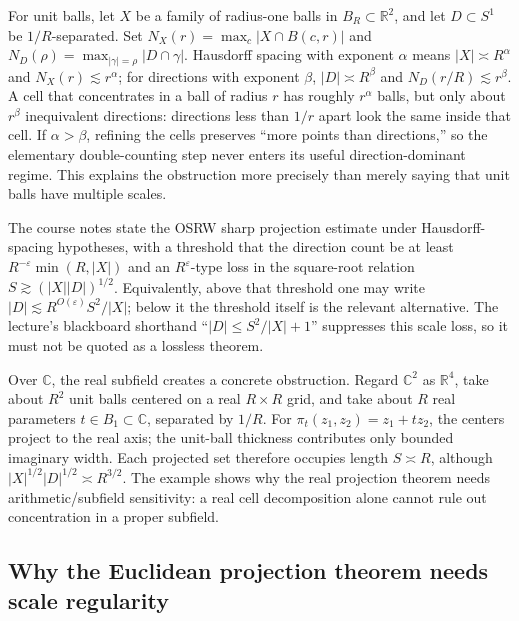 For unit balls, let \(X\) be a family of radius-one balls in \(B_R\subset\mathbb R^2\), and let \(D\subset S^1\) be \(1/R\)-separated. Set \(N_X(r)=\max_c|X\cap B(c,r)|\) and \(N_D(\rho)=\max_{|\gamma|=\rho}|D\cap\gamma|\). Hausdorff spacing with exponent \(\alpha\) means \(|X|\asymp R^\alpha\) and \(N_X(r)\lesssim r^\alpha\); for directions with exponent \(\beta\), \(|D|\asymp R^\beta\) and \(N_D(r/R)\lesssim r^\beta\). A cell that concentrates in a ball of radius \(r\) has roughly \(r^\alpha\) balls, but only about \(r^\beta\) inequivalent directions: directions less than \(1/r\) apart look the same inside that cell. If \(\alpha>\beta\), refining the cells preserves ``more points than directions,'' so the elementary double-counting step never enters its useful direction-dominant regime. This explains the obstruction more precisely than merely saying that unit balls have multiple scales.

The course notes state the OSRW sharp projection estimate under Hausdorff-spacing hypotheses, with a threshold that the direction count be at least \(R^{-\varepsilon}\min(R,|X|)\) and an \(R^{\varepsilon}\)-type loss in the square-root relation \(S\gtrsim (|X||D|)^{1/2}\). Equivalently, above that threshold one may write \(|D|\lesssim R^{O(\varepsilon)}S^2/|X|\); below it the threshold itself is the relevant alternative. The lecture's blackboard shorthand ``\(|D|\le S^2/|X|+1\)'' suppresses this scale loss, so it must not be quoted as a lossless theorem.

Over \(\mathbb C\), the real subfield creates a concrete obstruction. Regard \(\mathbb C^2\) as \(\mathbb R^4\), take about \(R^2\) unit balls centered on a real \(R\times R\) grid, and take about \(R\) real parameters \(t\in B_1\subset\mathbb C\), separated by \(1/R\). For \(\pi_t(z_1,z_2)=z_1+tz_2\), the centers project to the real axis; the unit-ball thickness contributes only bounded imaginary width. Each projected set therefore occupies length \(S\asymp R\), although \(|X|^{1/2}|D|^{1/2}\asymp R^{3/2}\). The example shows why the real projection theorem needs arithmetic/subfield sensitivity: a real cell decomposition alone cannot rule out concentration in a proper subfield.

\subsection{Why the Euclidean projection theorem needs scale regularity}\label{04-visual-computing-ii-ch033-why-the-euclidean-projection-theorem-needs-scale-regularity}


